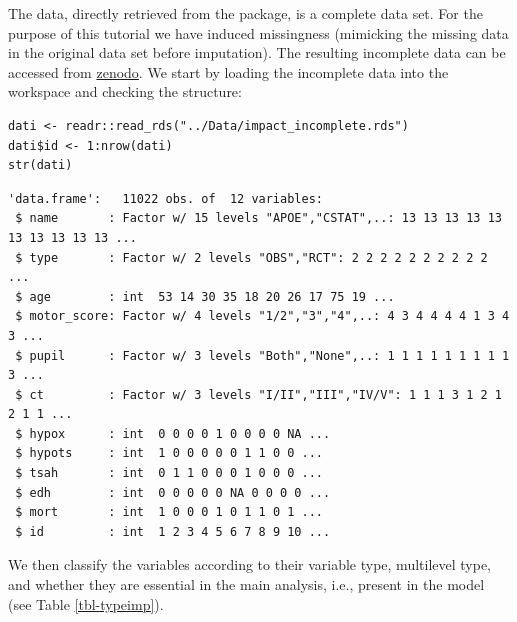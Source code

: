 \documentclass[
  article]{jss}
\begin{document}
The  data, directly retrieved from the 
package, is a complete data set. For the purpose of this tutorial we
have induced missingness (mimicking the missing data in the original
data set before imputation). The resulting incomplete data can be
accessed from \href{http://www.zenodo.com}{zenodo}. We start by loading
the incomplete data into the  workspace and checking the
structure:

\begin{verbatim}
dati <- readr::read_rds("../Data/impact_incomplete.rds")
dati$id <- 1:nrow(dati)
str(dati)
\end{verbatim}

\begin{verbatim}
'data.frame':   11022 obs. of  12 variables:
 $ name       : Factor w/ 15 levels "APOE","CSTAT",..: 13 13 13 13 13 13 13 13 13 13 ...
 $ type       : Factor w/ 2 levels "OBS","RCT": 2 2 2 2 2 2 2 2 2 2 ...
 $ age        : int  53 14 30 35 18 20 26 17 75 19 ...
 $ motor_score: Factor w/ 4 levels "1/2","3","4",..: 4 3 4 4 4 4 1 3 4 3 ...
 $ pupil      : Factor w/ 3 levels "Both","None",..: 1 1 1 1 1 1 1 1 1 3 ...
 $ ct         : Factor w/ 3 levels "I/II","III","IV/V": 1 1 1 3 1 2 1 2 1 1 ...
 $ hypox      : int  0 0 0 0 1 0 0 0 0 NA ...
 $ hypots     : int  1 0 0 0 0 0 1 1 0 0 ...
 $ tsah       : int  0 1 1 0 0 0 1 0 0 0 ...
 $ edh        : int  0 0 0 0 0 NA 0 0 0 0 ...
 $ mort       : int  1 0 0 0 1 0 1 1 0 1 ...
 $ id         : int  1 2 3 4 5 6 7 8 9 10 ...
\end{verbatim}

We then classify the variables according to their variable type,
multilevel type, and whether they are essential in the main analysis,
i.e., present in the model (see Table \ref{tbl-typeimp}).
\end{document}
